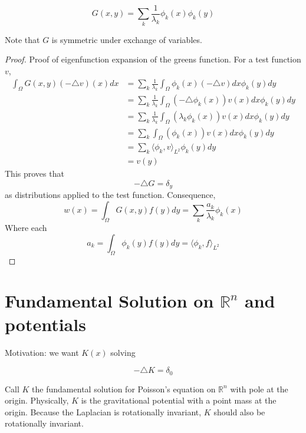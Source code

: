 \documentclass{article}
\newtheorem{one minute paper}[theorem]{One Minute Paper}
\begin{document}
\begin{equation}
    G(x,y) = \sum_k \frac{1}{\lambda_k}\phi_k(x)\phi_k(y)
\end{equation}

Note that $G$ is symmetric under exchange of variables.

\begin{proof}
    Proof of eigenfunction expansion of the greens function. For a test function $v$, 
    \begin{align*}
        \int_{\Omega}G(x,y)(-\triangle v)(x)dx &= \sum_k \frac{1}{\lambda_k}\int_{\Omega}\phi_k(x)(-\triangle v)dx\phi_k(y)dy \\
        &= \sum_k \frac{1}{\lambda_k}\int_{\Omega}(-\triangle \phi_k(x))v(x)dx\phi_k(y)dy \\
        &= \sum_k \frac{1}{\lambda_k}\int_{\Omega}(\lambda_k \phi_k(x))v(x)dx\phi_k(y)dy \\
        &= \sum_k \int_{\Omega}(\phi_k(x))v(x)dx\phi_k(y)dy \\
        &= \sum_k \langle \phi_k, v\rangle_{L^2}\phi_k(y)dy \\
        &= v(y)
    \end{align*}
    This proves that 
    \begin{equation}
        -\triangle G = \delta_y
    \end{equation}
    as distributions applied to the test function. Consequence, 
    \begin{equation}
        w(x) = \int_{\Omega}G(x,y)f(y)dy = \sum_k \frac{a_k}{\lambda_k}\phi_k(x)
    \end{equation}
    Where each
    \begin{equation}
        a_k = \int_{\Omega}\phi_k(y)f(y)dy = \langle \phi_k, f \rangle_{L^2}
    \end{equation}
\end{proof}

\section*{Fundamental Solution on $\mathbb{R}^n$ and potentials}

Motivation: we want $K(x)$ solving 

\begin{equation}
    -\triangle K = \delta_0
\end{equation}

Call $K$ the fundamental solution for Poisson's equation on $\mathbb{R}^n$ with pole at the origin. 
Physically, $K$ is the gravitational potential with a point mass at the origin. Because the Laplacian is rotationally invariant, $K$ should also be rotationally invariant. 
\end{document}
